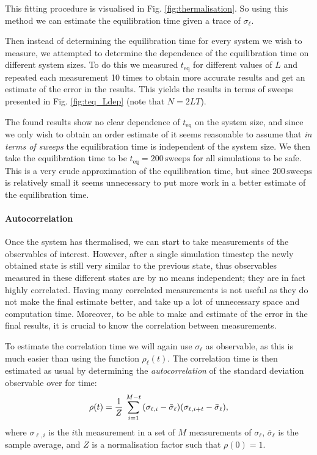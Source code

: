 This fitting procedure is visualised in Fig. \ref{fig:thermalisation}.
So using this method we can estimate the equilibration time given a trace of $\sigma_\ell$.

Then instead of determining the equilibration time for every system we wish to measure, we attempted to determine the dependence of the equilibration time on different system sizes.
To do this we measured $t_\text{eq}$ for different values of $L$ and repeated each measurement 10 times to obtain more accurate results and get an estimate of the error in the results.
This yields the results in terms of sweeps presented in Fig. \ref{fig:teq_Ldep} (note that $N = 2 L T$).

The found results show no clear dependence of $t_\text{eq}$ on the system size, and since we only wish to obtain an order estimate of it seems reasonable to assume that \emph{in terms of sweeps} the equilibration time is independent of the system size.
We then take the equilibration time to be $t_\text{eq} = 200 \, \text{sweeps}$ for all simulations to be safe.
This is a very crude approximation of the equilibration time, but since $200 \, \text{sweeps}$ is relatively small it seems unnecessary to put more work in a better estimate of the equilibration time.


\paragraph{Autocorrelation}
Once the system has thermalised, we can start to take measurements of the observables of interest.
However, after a single simulation timestep the newly obtained state is still very similar to the previous state, thus observables measured in these different states are by no means independent; they are in fact highly correlated.
Having many correlated measurements is not useful as they do not make the final estimate better, and take up a lot of unnecessary space and computation time.
Moreover, to be able to make and estimate of the error in the final results, it is crucial to know the correlation between measurements.

To estimate the correlation time we will again use $\sigma_\ell$ as observable, as this is much easier than using the function $\rho_\ell(t)$.
The correlation time is then estimated as usual by determining the \emph{autocorrelation} of the standard deviation observable over for time:
\begin{equation*}
    \rho(t) = \frac{1}{Z} \, \sum_{i = 1}^{M - t} \qty(\sigma_{\ell, i} - \bar{\sigma}_\ell) \qty(\sigma_{\ell, i + t} - \bar{\sigma}_\ell),
\end{equation*}
where $\sigma_{\ell, i}$ is the $i$th measurement in a set of $M$ measurements of $\sigma_\ell$, $\bar \sigma_\ell$ is the sample average, and $Z$ is a normalisation factor such that $\rho(0) = 1$.


